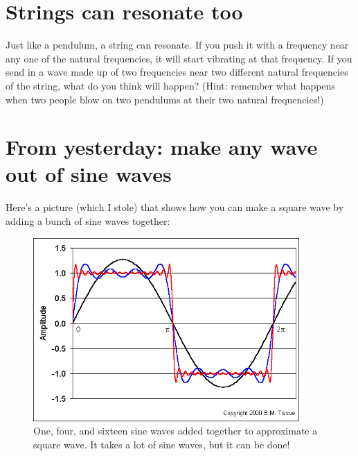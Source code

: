 \documentclass{article}
\begin{document}
\section*{Strings can resonate too}
Just like a pendulum, a string can resonate.  If you push it with a
frequency near any one of the natural frequencies, it will start
vibrating at that frequency.  If you send in a wave made up of two
frequencies near two different natural frequencies of the string, what
do you think will happen? (Hint: remember what happens when two people
blow on two pendulums at their two natural frequencies!)

\section*{From yesterday: make any wave out of sine waves}
Here's a picture (which I stole) that shows how you can make a square
wave by adding a bunch of sine waves together:

\begin{figure}[h]
\begin{center}
	\includegraphics[width=4in]{figures/square_wave.png}
	\caption{One, four, and sixteen sine waves added together to
	approximate a square wave.  It takes a lot of sine waves, but
	it can be done!}
\end{center}
\end{figure}
\end{document}
